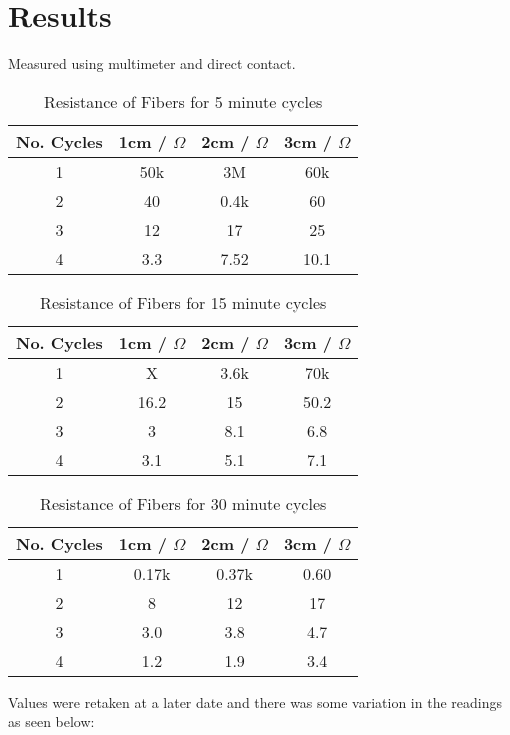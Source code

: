 \documentclass{article}
\begin{document}
\pagebreak
\section{Results}
Measured using multimeter and direct contact.
\begin{table}[h!]
\centering
\begin{tabular}{ |c|c|c|c| } 
    \hline
    No. Cycles &  1cm / $\Omega$ & 2cm / $\Omega$ & 3cm / $\Omega$  \\
    \hline
    1 & 50k & 3M & 60k \\
    2 & 40 & 0.4k & 60\\
    3 & 12 & 17 & 25\\
    4 & 3.3 & 7.52 & 10.1\\
    \hline
\end{tabular}
 \caption{Resistance of Fibers for 5 minute cycles}
\label{table:1}
\end{table}

\begin{table}[h!]
\centering
\begin{tabular}{ |c|c|c|c| } 
    \hline
    No. Cycles &  1cm / $\Omega$ & 2cm / $\Omega$ & 3cm / $\Omega$  \\
    \hline
    1 & X & 3.6k & 70k \\
    2 & 16.2 & 15 & 50.2\\
    3 & 3 & 8.1 & 6.8\\
    4 & 3.1 & 5.1 & 7.1\\
    \hline
\end{tabular}
 \caption{Resistance of Fibers for 15 minute cycles}
\label{table:2}
\end{table}

\begin{table}[h!]
\centering
\begin{tabular}{ |c|c|c|c| } 
    \hline
    No. Cycles &  1cm / $\Omega$ & 2cm / $\Omega$ & 3cm / $\Omega$  \\
    \hline
    1 & 0.17k & 0.37k & 0.60\\
    2 & 8 & 12 & 17\\
    3 & 3.0 & 3.8 & 4.7\\
    4 & 1.2 & 1.9 & 3.4\\
    \hline
\end{tabular}
 \caption{Resistance of Fibers for 30 minute cycles}
\label{table:3}
\end{table}


\pagebreak
Values were retaken at a later date and there was some variation in the readings as seen below:
\end{document}
